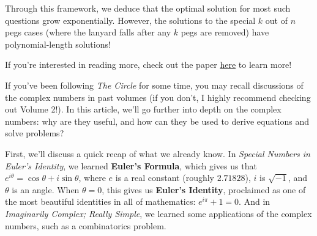 \documentclass{article}
\begin{document}
\begin{multicols}{3}
Through this framework, we deduce that the optimal solution for most such questions grow exponentially. However, the solutions to the special $k$ out of $n$ pegs cases (where the lanyard falls after any $k$ pegs are removed) have polynomial-length solutions!

If you’re interested in reading more, check out the paper \href{https://erikdemaine.org/papers/PictureHanging_FUN2012/paper.pdf}{here} to learn more! 
\closearticle

If you've been following \textit{The Circle} for some time, you may recall discussions of the complex numbers in past volumes (if you don't, I highly recommend checking out Volume 2!). In this article, we'll go further into depth on the complex numbers: why are they useful, and how can they be used to derive equations and solve problems?

First, we'll discuss a quick recap of what we already know. In \textit{Special Numbers in Euler's Identity}, we learned \textbf{Euler's Formula}, which gives us that $e^{i\theta}=\cos\theta+i\sin\theta$, where $e$ is a real constant (roughly $2.71828$), $i$ is $\sqrt{-1}$, and $\theta$ is an angle. When $\theta=0$, this gives us \textbf{Euler's Identity}, proclaimed as one of the most beautiful identities in all of mathematics: $e^{i\pi}+1=0$. And in \textit{Imaginarily Complex; Really Simple}, we learned some applications of the complex numbers, such as a combinatorics problem.


\end{multicols}
\end{document}
